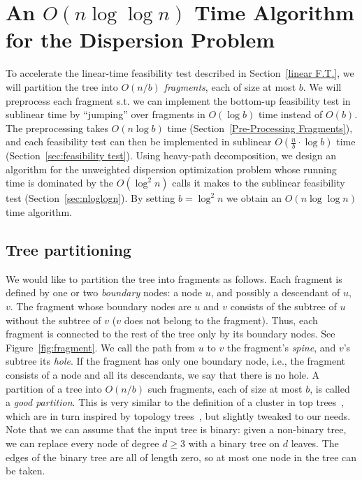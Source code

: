 \documentclass[11pt,a4paper]{article}
\theoremstyle{definition}
\theoremstyle{remark}
\begin{document}
\section{An \texorpdfstring{\boldmath$O(n\log\log n)$}{O(nloglogn)} Time Algorithm for the Dispersion Problem}
\label{sublinear f.t.}

To accelerate the linear-time feasibility test described in Section~\ref{linear F.T.}, we will partition the tree into $O(n/b)$ {\em fragments}, each of size at most
$b$. We will preprocess each fragment s.t. we can implement the bottom-up feasibility test in sublinear time by  ``jumping'' over fragments in $O(\log b)$ time instead of $O(b)$.  The preprocessing takes $O(n\log b)$ time (Section~\ref{Pre-Processing Fragments}), and each feasibility test can then be implemented in sublinear $O(\frac{n}{b} \cdot \log b)$ time (Section~\ref{sec:feasibility test}). Using heavy-path decomposition, we design an algorithm for the unweighted dispersion optimization problem whose running time is dominated by the $O(\log^{2}n)$ calls it makes to the sublinear feasibility test  (Section~\ref{sec:nloglogn}). By setting $b=\log^{2}n$ we obtain an $O(n\log\log n)$ time algorithm.

\subsection{Tree partitioning}
We would like to partition the tree into fragments as follows. Each fragment is defined by one or two {\em boundary} nodes: a node $u$, and possibly a descendant of $u$, $v$. The fragment whose boundary nodes are $u$ and $v$ consists of the subtree of $u$ without the subtree of $v$ ($v$ does not belong to the fragment). Thus, each fragment is connected to the rest of the tree only by its boundary nodes. See Figure~\ref{fig:fragment}. 
We call the path from $u$ to $v$ the fragment's \textit{spine}, and $v$'s subtree its \textit{hole}. If the
fragment has only one boundary node, i.e., the fragment consists of a node and all its descendants, we say that there is no hole.
A partition of a tree into $O(n/b)$ such fragments, each of size at most $b$, is called a \emph{good partition}.
This is very similar to the definition of a cluster in top trees~\cite{TopTrees}, which are in turn inspired by topology trees~\cite{Frederickson1985},
but slightly tweaked to our needs.
Note that we can assume that the input tree is binary: given a non-binary tree, we can replace every node of degree $d\geq 3$ with a binary tree on
$d$ leaves. The edges of the binary tree are all of length zero, so at most one node in the tree can be taken.
\end{document}
